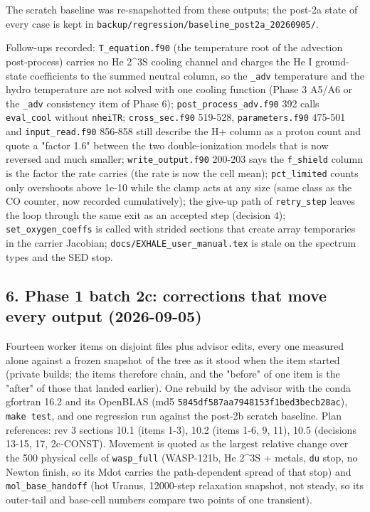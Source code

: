 \documentclass[english,a4paper]{my_memo}
\begin{document}
The scratch baseline was re-snapshotted from these outputs; the post-2a
state of every case is kept in \texttt{backup/regression/baseline\_post2a\_20260905/}.

Follow-ups recorded: \texttt{T\_equation.f90} (the temperature root of the
advection post-process) carries no He 2\^{}3S cooling channel and charges the
He I ground-state coefficients to the summed neutral column, so the \texttt{\_adv}
temperature and the hydro temperature are not solved with one cooling
function (Phase 3 A5/A6 or the \texttt{\_adv} consistency item of Phase 6);
\texttt{post\_process\_adv.f90} 392 calls \texttt{eval\_cool} without \texttt{nheiTR};
\texttt{cross\_sec.f90} 519-528, \texttt{parameters.f90} 475-501 and \texttt{input\_read.f90}
856-858 still describe the H+ column as a proton count and quote a "factor
1.6" between the two double-ionization models that is now reversed and much
smaller; \texttt{write\_output.f90} 200-203 says the \texttt{f\_shield} column is the factor
the rate carries (the rate is now the cell mean); \texttt{pct\_limited} counts only
overshoots above 1e-10 while the clamp acts at any size (same class as the
CO counter, now recorded cumulatively); the give-up path of \texttt{retry\_step}
leaves the loop through the same exit as an accepted step (decision 4);
\texttt{set\_oxygen\_coeffs} is called with strided sections that create array
temporaries in the carrier Jacobian; \texttt{docs/EXHALE\_user\_manual.tex} is stale
on the spectrum types and the SED stop.

\subsection{6. Phase 1 batch 2c: corrections that move every output (2026-09-05)}\label{6-phase-1-batch-2c-corrections-that-move-every-output-2026-09-05}

Fourteen worker items on disjoint files plus advisor edits, every one
measured alone against a frozen snapshot of the tree as it stood when the
item started (private builds; the items therefore chain, and the "before" of
one item is the "after" of those that landed earlier). One rebuild by the
advisor with the conda gfortran 16.2 and its OpenBLAS (md5
\texttt{5845df587aa7948153f1bed3becb28ac}), \texttt{make\ test}, and one regression run
against the post-2b scratch baseline. Plan references: rev 3 sections 10.1
(items 1-3), 10.2 (items 1-6, 9, 11), 10.5 (decisions 13-15, 17, 2c-CONST).
Movement is quoted as the largest relative change over the 500 physical
cells of \texttt{wasp\_full} (WASP-121b, He 2\^{}3S + metals, \texttt{du} stop, no Newton
finish, so its Mdot carries the path-dependent spread of that stop) and
\texttt{mol\_base\_handoff} (hot Uranus, 12000-step relaxation snapshot, not steady,
so its outer-tail and base-cell numbers compare two points of one transient).
\end{document}
